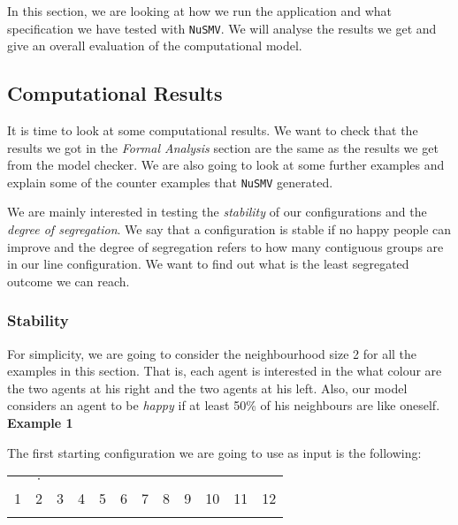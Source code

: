 \documentclass[../main.tex]{subfiles}
\begin{document}
In this section, we are looking at how we run the application and what specification we have tested with \verb|NuSMV|. We will analyse the results we get and give an overall evaluation of the computational model.

\subsection{Computational Results}
It is time to look at some computational results. We want to check that the results we got in the \textit{Formal Analysis} section are the same as the results we get from the model checker. We are also going to look at some further examples and explain some of the counter examples that \verb|NuSMV| generated.


We are mainly interested in testing the \textit{stability} of our configurations and the \textit{degree of segregation}. We say that a configuration is stable if no happy people can improve and the degree of segregation refers to how many contiguous groups are in our line configuration. We want to find out what is the least segregated outcome we can reach. 

\subsubsection{Stability }
For simplicity, we are going to consider the neighbourhood size 2 for all the examples in this section. That is, each agent is interested in the what colour are the two agents at his right and the two agents at his left. Also, our model considers an agent to be \textit{happy} if at least 50\% of his neighbours are like oneself.\\

\textbf{Example 1}

The first starting configuration we are going to use as input is the following:

\begin{table}[H]
\begin{center}
{\begin{tabular}{| c |c| c| c| c |c| c |c| c |c |c |c |}
\hline
 & $\cdot$ &  & & & &  & &  & & &\\
1 & 2 &3 &4 &5 &6  &7 &8 & 9 & 10 &11&12\\
\x & \x &\z &\z &\z &\z  &\z &\z &\x &\x &\x & \x \\
 \hline
\end{tabular}}
\end{center}
\end{table}
\end{document}
